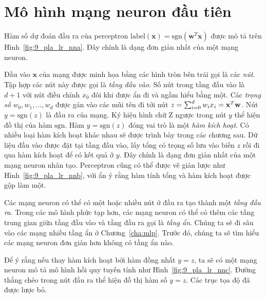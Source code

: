 \section{Mô hình mạng neuron đầu tiên}
Hàm số dự đoán đầu ra của perceptron $\text{label}(\mathbf{x}) = \text{sgn}(\mathbf{w}^T\mathbf{x})$ được mô tả trên Hình~\ref{fig:9_pla_lr_nna}. Đây chính là dạng đơn giản nhất của một mạng neuron.

Đầu vào $\mathbf{x}$ của mạng được minh họa bằng các hình tròn bên trái gọi là
các \textit{nút}. Tập hợp các nút này được gọi là \textit{tầng đầu vào}. Số nút
trong tầng đầu vào là $d + 1$ với nút điều chỉnh $x_0$ đôi khi được ẩn đi và ngầm hiểu  bằng một. Các \textit{trọng số} $w_0, w_1, \dots, w_d$ được gán vào các mũi
tên đi tới nút $ z = \sum_{i=0}^dw_ix_i =
\mathbf{x}^T\mathbf{w}$. Nút $y = \text{sgn}(z)$ là đầu ra của
mạng. Ký hiệu hình chữ Z ngược trong nút $y$ thể hiện đồ thị của hàm
$\text{sgn}$. Hàm $y = \text{sgn}(z)$ đóng vai trò là một \textit{hàm kích
hoạt}. Có nhiều loại hàm kích hoạt khác nhau sẽ được trình bày trong các chương sau. Dữ liệu đầu vào được đặt tại tầng đầu vào, lấy tổng có trọng số lưu vào
biến $z$ rồi đi qua hàm kích hoạt để có kết quả ở $y$. Đây chính là dạng đơn
giản nhất của một mạng neuron nhân tạo. Perceptron cũng có thể được vẽ giản lược
như Hình~\ref{fig:9_pla_lr_nnb}, với ẩn ý rằng hàm tính tổng và hàm kích hoạt
được gộp làm một.

Các mạng neuron có thể có một hoặc nhiều nút ở đầu ra tạo thành một \textit{tầng
đầu ra}. Trong các mô hình phức tạp hơn, các mạng neuron có thể có thêm các tầng
trung gian giữa tầng đầu vào và tầng đầu ra gọi là \textit{tầng ẩn}. Chúng
ta sẽ đi sâu vào các mạng nhiều tầng ẩn ở Chương~\ref{cha:mlp}. Trước đó, chúng
ta sẽ tìm hiểu các mạng neuron đơn giản hơn không có tầng ẩn nào.


Để ý rằng nếu thay hàm kích hoạt bởi hàm đồng nhất $y = z$, ta sẽ có một mạng neuron mô tả mô hình hồi quy tuyến tính như Hình~\ref{fig:9_pla_lr_nnc}.
Đường thẳng chéo trong nút đầu ra thể hiện đồ thị hàm số $y = z$. Các trục tọa độ đã
được lược bỏ.



